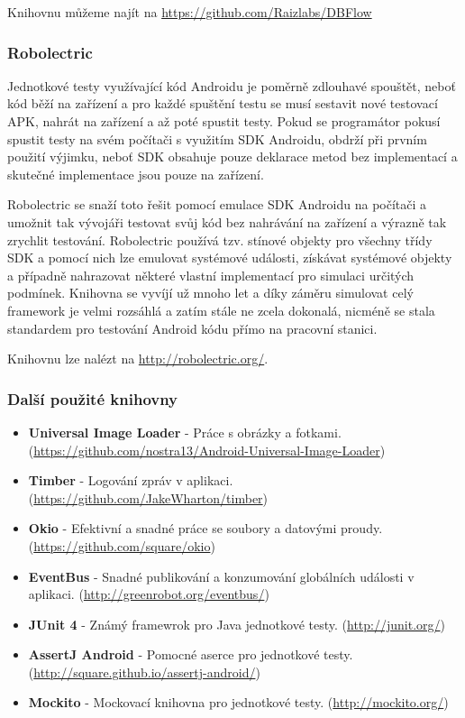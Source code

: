 \documentclass{article}
\begin{document}
  Knihovnu můžeme najít na \url{https://github.com/Raizlabs/DBFlow}


\subsubsection{Robolectric}\label{robolectric}
Jednotkové testy využívající kód Androidu je poměrně zdlouhavé spouštět, neboť kód běží na
zařízení a pro každé spuštění testu se musí sestavit nové testovací APK, nahrát na zařízení
a až poté spustit testy. Pokud se programátor pokusí spustit testy na svém počítači s využitím
SDK Androidu, obdrží při prvním použití výjimku, neboť SDK obsahuje pouze deklarace metod
bez implementací a skutečné implementace jsou pouze na zařízení.

Robolectric se snaží toto řešit pomocí emulace SDK Androidu na počítači a umožnit tak vývojáři
testovat svůj kód bez nahrávání na zařízení a výrazně tak zrychlit testování. Robolectric
používá tzv. stínové objekty pro všechny třídy SDK a pomocí nich lze emulovat systémové události,
získávat systémové objekty a případně nahrazovat některé vlastní implementací pro simulaci
určitých podmínek. Knihovna se vyvíjí už mnoho let a díky záměru simulovat celý framework je velmi
rozsáhlá a zatím stále ne zcela dokonalá, nicméně se stala standardem pro testování Android kódu
přímo na pracovní stanici.

Knihovnu lze nalézt na \url{http://robolectric.org/}.

\subsubsection{Další použité knihovny}
\begin{itemize}
  \item \textbf{Universal Image Loader} - Práce s obrázky a fotkami. (\url{https://github.com/nostra13/Android-Universal-Image-Loader})
  \item \textbf{Timber} - Logování zpráv v aplikaci. (\url{https://github.com/JakeWharton/timber})
  \item \textbf{Okio} - Efektivní a snadné práce se soubory a datovými proudy. (\url{https://github.com/square/okio})
  \item \textbf{EventBus} - Snadné publikování a konzumování globálních události v aplikaci. (\url{http://greenrobot.org/eventbus/})
  \item \textbf{JUnit 4} - Známý framewrok pro Java jednotkové testy. (\url{http://junit.org/})
  \item \textbf{AssertJ Android} - Pomocné aserce pro jednotkové testy. (\url{http://square.github.io/assertj-android/})
  \item \textbf{Mockito} - Mockovací knihovna pro jednotkové testy. (\url{http://mockito.org/})
\end{itemize}
\end{document}
